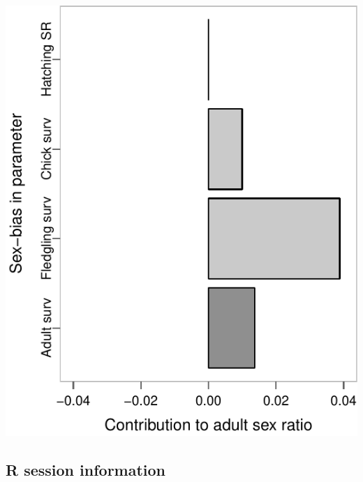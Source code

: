 \documentclass[]{article}
\begin{document}
\begin{center}\includegraphics{Ceuta_ASR_Matrix_Modeling_files/figure-latex/unnamed-chunk-32-1} \end{center}

\subsection{R session information}\label{r-session-information}
\end{document}
